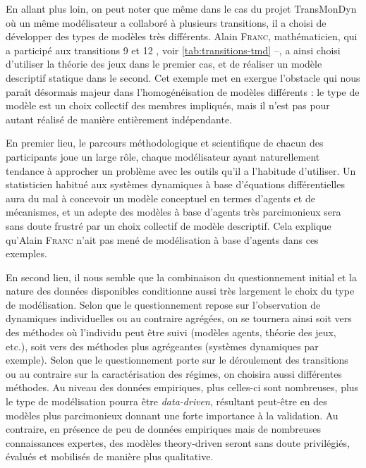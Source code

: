 En allant plus loin, on peut noter que même dans le cas du projet TransMonDyn où un même modélisateur a collaboré à plusieurs transitions, il a choisi de développer des types de modèles très différents.
Alain \textsc{Franc}, mathématicien, qui a participé aux transitions 9 \autocite{ouriachi_transition_2018} et 12 \autocite{bretagnolle_transition_2018}, voir \cref{tab:transitions-tmd} --, a ainsi choisi d'utiliser la théorie des jeux dans le premier cas, et de réaliser un modèle descriptif statique dans le second.
Cet exemple met en exergue l'obstacle qui nous paraît désormais majeur dans l'homogénéisation de modèles différents : le type de modèle est un choix collectif des membres impliqués, mais il n'est pas pour autant réalisé de manière entièrement indépendante.

En premier lieu, le parcours méthodologique et scientifique de chacun des participants joue un large rôle, chaque modélisateur ayant naturellement tendance à approcher un problème avec les outils qu'il a l'habitude d'utiliser.
Un statisticien habitué aux systèmes dynamiques à base d'équations différentielles aura du mal à concevoir un modèle conceptuel en termes d'agents et de mécanismes, et un adepte des modèles à base d'agents très parcimonieux sera sans doute frustré par un choix collectif de modèle descriptif.
Cela explique qu'Alain \textsc{Franc} n'ait pas mené de modélisation à base d'agents dans ces exemples.

En second lieu, il nous semble que la combinaison du questionnement initial et la nature des données disponibles conditionne aussi très largement le choix du type de modélisation.
Selon que le questionnement repose sur l'observation de dynamiques individuelles ou au contraire agrégées, on se tournera ainsi soit vers des méthodes où l'individu peut être suivi (modèles agents, théorie des jeux, etc.), soit vers des méthodes plus agrégeantes (systèmes dynamiques par exemple).
Selon que le questionnement porte sur le déroulement des \og transitions\fg{} ou au contraire sur la caractérisation des \og régimes\fg{}, on choisira aussi différentes méthodes.
Au niveau des données empiriques, plus celles-ci sont nombreuses, plus le type de modélisation pourra être \og \textit{data-driven}\fg, résultant peut-être en des modèles plus parcimonieux donnant une forte importance à la validation.
Au contraire, en présence de peu de données empiriques mais de nombreuses connaissances expertes, des modèles \og theory-driven\fg{} seront sans doute privilégiés, évalués et mobilisés de manière plus qualitative.


